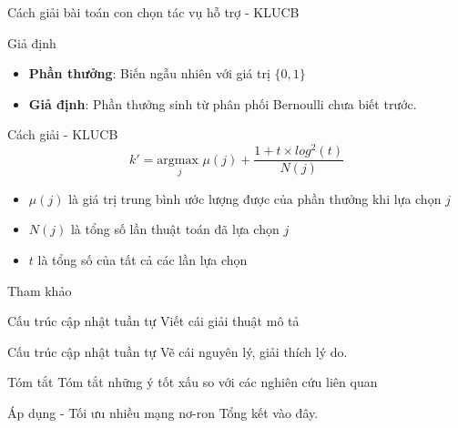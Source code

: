 \begin{frame}{Cách giải bài toán con chọn tác vụ hỗ trợ - KLUCB}
    \begin{block}{Giả định}
        \begin{itemize}
            \item \textbf{Phần thưởng}: Biến ngẫu nhiên với giá trị $\{0, 1\}$
            \item \textbf{Giả định}: Phần thưởng sinh từ phân phối Bernoulli chưa biết trước.
        \end{itemize}
    \end{block}
    \begin{block}{Cách giải - KLUCB}
        \begin{equation}
            k' = \underset{j}{\text{argmax }} \mu(j) + \frac{1 + t \times log^2(t) }{N(j)}
            \label{eq:propose:klucb}
        \end{equation}
        \begin{itemize}
            \item $\mu(j)$ là giá trị trung bình ước lượng được của phần thưởng khi lựa chọn $j$
            \item $N(j)$ là tổng số lần thuật toán đã lựa chọn $j$
            \item $t$ là tổng số của tất cả các lần lựa chọn
        \end{itemize}
    \end{block}
    \begin{block}{Tham khảo}
    \end{block}
\end{frame}

\begin{frame}{Cấu trúc cập nhật tuần tự}
    Viết cái giải thuật mô tả
\end{frame}

\begin{frame}{Cấu trúc cập nhật tuần tự}
    Vẽ cái nguyên lý, giải thích lý do.
\end{frame}

\begin{frame}{Tóm tắt}
    Tóm tắt những ý tốt xấu so với các nghiên cứu liên quan
\end{frame}

\begin{frame}{Áp dụng - Tối ưu nhiều mạng nơ-ron}
    Tổng kết vào đây.
\end{frame}


